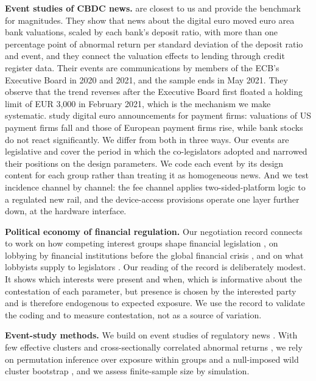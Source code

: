 \documentclass[11pt]{article}
\theoremstyle{plain}\newtheorem{proposition}{Proposition}
\begin{document}
\textbf{Event studies of CBDC news.} \citet{burlon2024} are closest to us and provide the benchmark for magnitudes. They show that news about the digital euro moved euro area bank valuations, scaled by each bank's deposit ratio, with more than one percentage point of abnormal return per standard deviation of the deposit ratio and event, and they connect the valuation effects to lending through credit register data. Their events are communications by members of the ECB's Executive Board in 2020 and 2021, and the sample ends in May 2021. They observe that the trend reverses after the Executive Board first floated a holding limit of EUR 3,000 in February 2021, which is the mechanism we make systematic. \citet{berg2024} study digital euro announcements for payment firms: valuations of US payment firms fall and those of European payment firms rise, while bank stocks do not react significantly. We differ from both in three ways. Our events are legislative and cover the period in which the co-legislators adopted and narrowed their positions on the design parameters. We code each event by its design content for each group rather than treating it as homogeneous news. And we test incidence channel by channel: the fee channel applies two-sided-platform logic \citep{rochet2003} to a regulated new rail, and the device-access provisions operate one layer further down, at the hardware interface.

\textbf{Political economy of financial regulation.} Our negotiation record connects to work on how competing interest groups shape financial legislation \citep{kroszner1998}, on lobbying by financial institutions before the global financial crisis \citep{igan2012}, and on what lobbyists supply to legislators \citep{bertrand2014}. Our reading of the record is deliberately modest. It shows which interests were present and when, which is informative about the contestation of each parameter, but presence is chosen by the interested party and is therefore endogenous to expected exposure. We use the record to validate the coding and to measure contestation, not as a source of variation.

\textbf{Event-study methods.} We build on event studies of regulatory news \citep{schwert1981,binder1985,mackinlay1997}. With few effective clusters and cross-sectionally correlated abnormal returns \citep{kolari2010}, we rely on permutation inference over exposure within groups and a null-imposed wild cluster bootstrap \citep{cameron2008}, and we assess finite-sample size by simulation.
\end{document}
